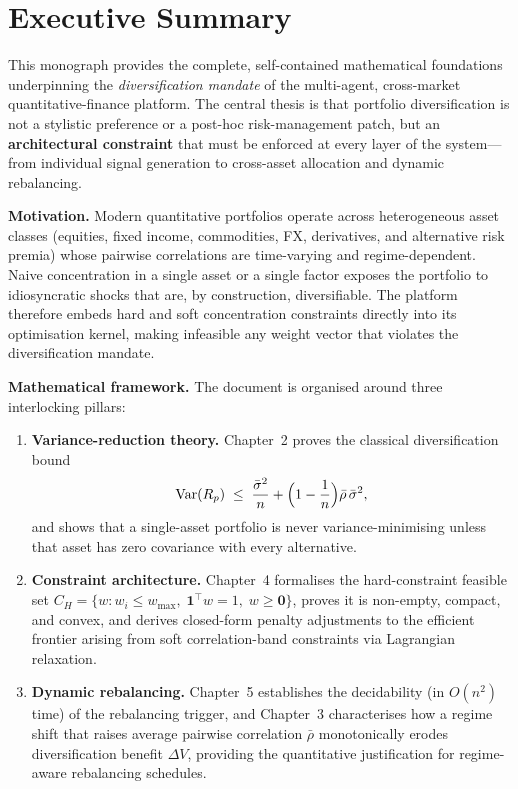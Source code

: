 \documentclass[12pt,openany]{book}
\newcommand{\bfw}{\mathbf{w}}
\newcommand{\bfone}{\mathbf{1}}
\newcommand{\calC}{\mathcal{C}}
\DeclareMathOperator{\Var}{Var}
\numberwithin{equation}{chapter}
\theoremstyle{plain}
\theoremstyle{definition}
\theoremstyle{remark}
\def\mathcal#1{#1}%
\def\calC{C}%
\def\bfw{w}%
\begin{document}
\chapter*{Executive Summary}

\noindent
This monograph provides the complete, self-contained mathematical
foundations underpinning the \emph{diversification mandate} of the
multi-agent, cross-market quantitative-finance platform.  The central
thesis is that portfolio diversification is not a stylistic preference
or a post-hoc risk-management patch, but an \textbf{architectural
constraint} that must be enforced at every layer of the system—from
individual signal generation to cross-asset allocation and dynamic
rebalancing.

\medskip
\noindent\textbf{Motivation.}\quad
Modern quantitative portfolios operate across heterogeneous asset
classes (equities, fixed income, commodities, FX, derivatives, and
alternative risk premia) whose pairwise correlations are time-varying
and regime-dependent.  Naive concentration in a single asset or a
single factor exposes the portfolio to idiosyncratic shocks that are,
by construction, diversifiable.  The platform therefore embeds hard
and soft concentration constraints directly into its optimisation
kernel, making infeasible any weight vector that violates the
diversification mandate.

\medskip
\noindent\textbf{Mathematical framework.}\quad
The document is organised around three interlocking pillars:

\begin{enumerate}[label=\textbf{\arabic*.}, leftmargin=2em]
  \item \textbf{Variance-reduction theory.}  Chapter~2 proves the
    classical diversification bound
    \[
      \Var(R_p)
        \;\leq\;
        \frac{\bar{\sigma}^2}{n}
        + \Bigl(1 - \frac{1}{n}\Bigr)\bar{\rho}\,\bar{\sigma}^2,
    \]
    and shows that a single-asset portfolio is never variance-minimising
    unless that asset has zero covariance with every alternative.

  \item \textbf{Constraint architecture.}  Chapter~4 formalises the
    hard-constraint feasible set $\calC_H = \{\bfw : w_i \leq
    w_{\max},\;\bfone^\top\bfw = 1,\;\bfw \geq \mathbf{0}\}$, proves
    it is non-empty, compact, and convex, and derives closed-form
    penalty adjustments to the efficient frontier arising from
    soft correlation-band constraints via Lagrangian relaxation.

  \item \textbf{Dynamic rebalancing.}  Chapter~5 establishes the
    decidability (in $O(n^2)$ time) of the rebalancing trigger, and
    Chapter~3 characterises how a regime shift that raises average
    pairwise correlation $\bar{\rho}$ monotonically erodes
    diversification benefit $\Delta V$, providing the quantitative
    justification for regime-aware rebalancing schedules.
\end{enumerate}
\end{document}
